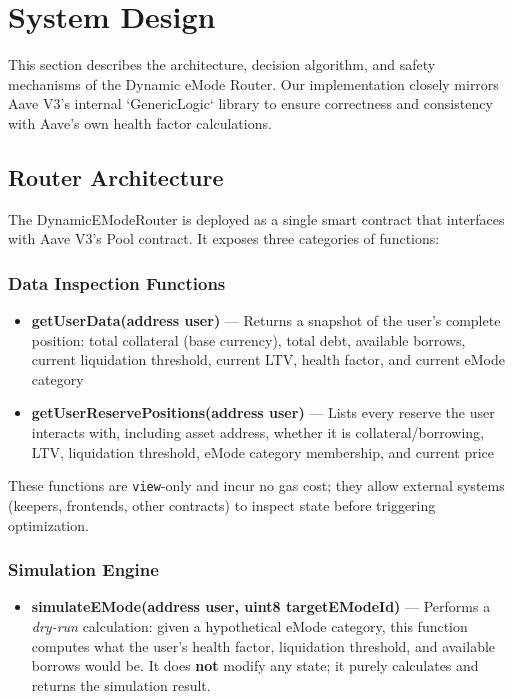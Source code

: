 \section{System Design}\label{sec:design}

This section describes the architecture, decision algorithm, and safety mechanisms of the Dynamic eMode Router. Our implementation closely mirrors Aave V3's internal `GenericLogic` library to ensure correctness and consistency with Aave's own health factor calculations.

\subsection{Router Architecture}\label{sec:router-architecture}

The DynamicEModeRouter is deployed as a single smart contract that interfaces with Aave V3's Pool contract. It exposes three categories of functions:

\subsubsection{Data Inspection Functions}

\begin{itemize}
    \item \textbf{getUserData(address user)} — Returns a snapshot of the user's complete position: total collateral (base currency), total debt, available borrows, current liquidation threshold, current LTV, health factor, and current eMode category
    \item \textbf{getUserReservePositions(address user)} — Lists every reserve the user interacts with, including asset address, whether it is collateral/borrowing, LTV, liquidation threshold, eMode category membership, and current price
\end{itemize}

These functions are \texttt{view}-only and incur no gas cost; they allow external systems (keepers, frontends, other contracts) to inspect state before triggering optimization.

\subsubsection{Simulation Engine}

\begin{itemize}
    \item \textbf{simulateEMode(address user, uint8 targetEModeId)} — Performs a \textit{dry-run} calculation: given a hypothetical eMode category, this function computes what the user's health factor, liquidation threshold, and available borrows would be. It does \textbf{not} modify any state; it purely calculates and returns the simulation result.
\end{itemize}

